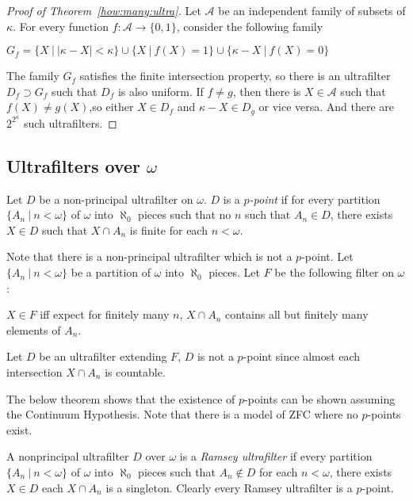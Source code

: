 \documentclass[8pt]{article}
\theoremstyle{definition}
\theoremstyle{definition}
\theoremstyle{definition}
\theoremstyle{definition}
\theoremstyle{definition}
\theoremstyle{definition}
\theoremstyle{definition}
\theoremstyle{definition}
\theoremstyle{definition}
\theoremstyle{definition}
\theoremstyle{definition}
\theoremstyle{definition}
\theoremstyle{definition}
\theoremstyle{definition}
\theoremstyle{question}
\begin{document}
\begin{proof}[Proof of Theorem~\ref{how:many:ultra}]
  Let $\mathcal{A}$ be an independent family of subsets of $\kappa$.
  For every function $f : \mathcal{A} \to \{ 0, 1 \}$, consider the following family
  \begin{center}
    $G_f = \{ X \:| \: |\kappa - X| < \kappa \} \cup \{ X \: | \: f(X) = 1\} \cup \{ \kappa - X \: | \: f(X) = 0 \}$
  \end{center}

  The family $G_f$ satisfies the finite intersection property, 
  so there is an ultrafilter $D_f \supset G_f$ such that $D_f$ is also uniform. If $f \neq g$, 
  then there is $X \in \mathcal{A}$ such that $f(X) \neq g(X)$,so either $X \in D_f$ and $\kappa - X \in D_g$ or vice versa.
  And there are $2^{2^{\kappa}}$ such ultrafilters.
\end{proof}

\subsection{Ultrafilters over $\omega$}

Let $D$ be a non-principal ultrafilter on $\omega$. $D$ is a \emph{$p$-point} if for every partition 
$\{ A_n \: | \: n < \omega \}$ of $\omega$ into $\aleph_0$ pieces such that no $n$ such that $A_n \in D$,
there exists $X \in D$ such that $X \cap A_n$ is finite for each $n < \omega$.

Note that there is a non-principal ultrafilter which is not a $p$-point. Let $\{ A_n \: | \: n < \omega \}$ 
be a partition of $\omega$ into $\aleph_0$ pieces. Let $F$ be the following filter on $\omega$:
\begin{center}
  $X \in F$ iff expect for finitely many $n$, $X \cap A_n$ contains all but finitely many elements of $A_n$.
\end{center}
Let $D$ be an ultrafilter extending $F$, $D$ is not a $p$-point since almost each intersection $X \cap A_n$ is countable.

The below theorem shows that the existence of $p$-points can be shown assuming the Continuum Hypothesis.
Note that there is a model of ZFC where no $p$-points exist.

A nonprincipal ultrafilter $D$ over $\omega$ is a \emph{Ramsey ultrafilter} if every partition 
$\{ A_n \: | \: n < \omega \}$ of $\omega$ into $\aleph_0$ pieces such that $A_n \notin D$ for each $n < \omega$,
there exists $X \in D$ each $X \cap A_n$ is a singleton. Clearly every Ramsey ultrafilter is a $p$-point.
\end{document}
